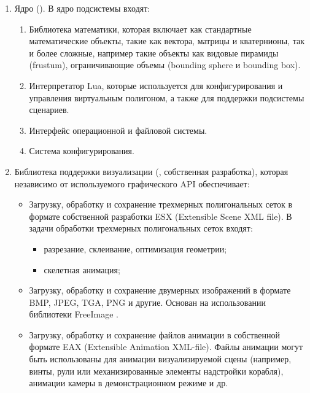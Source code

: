 \begin{enumerate}
	\item	Ядро (). В ядро подсистемы входят:
	\begin{enumerate}
		\item	Библиотека математики, которая включает как стандартные математические объекты, 
				такие как вектора, матрицы и кватернионы, так и более сложные, например 
				такие объекты как видовые пирамиды (frustum), ограничивающие объемы (bounding sphere и bounding box).
		\item	Интерпретатор Lua, которые используется для конфигурирования 
				и управления виртуальным полигоном, 
				а также для поддержки подсистемы сценариев.
		\item 	Интерфейс операционной и файловой системы.
		\item	Система конфигурирования.
	\end{enumerate}
	\item 	Библиотека поддержки визуализации (, собственная разработка), 
			которая независимо от используемого графического API обеспечивает:
			\begin{itemize}
			\item	Загрузку, обработку и сохранение трехмерных полигональных сеток в 
					формате собственной разработки ESX (Extensible Scene XML file). 
					В задачи обработки трехмерных полигональных сеток входят:
					\begin{itemize}
					\item	разрезание, склеивание, оптимизация геометрии;
					\item	скелетная анимация;
					\end{itemize}
			\item	Загрузку, обработку и сохранение двумерных изображений 
					в формате BMP, JPEG, TGA, PNG и другие. 
					Основан на использовании библиотеки FreeImage \citep{freeimage}.
			\item	Загрузку, обработку и сохранение файлов анимации в собственной формате 
					EAX (Extensible Animation XML-file). Файлы анимации могут быть использованы 
					для анимации визуализируемой сцены (например, винты, рули или механизированные 
					элементы надстройки корабля), анимации камеры в 
					демонстрационном режиме и др.
			\end{itemize}

\end{enumerate}
